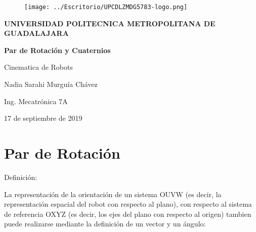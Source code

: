 \documentclass[letterpaper, openright, 12pt, spanish]{report}
\begin{document}
\begin{titlepage}

\begin{center}
\vspace*{-1in}
\begin{figure}[htb]
\begin{center}
\caption{}
\centering
\texttt{[image: ../Escritorio/UPCDLZMDG5783-logo.png]}

\end{center}
\end{figure}

\textbf{UNIVERSIDAD POLITECNICA METROPOLITANA DE GUADALAJARA}\\

\vspace*{0.6in}
\begin{large}
\textbf{Par de Rotaci\'on y Cuaternios}\\
\end{large}

\vspace*{0.1in}
\begin{large}
Cinematica de Robots\\
\end{large}

\vspace*{0.2in}
\begin{large}
Nadia Sarahi Murgu\'ia Ch\'avez\\
\end{large}

\vspace*{0.1in}
\begin{large}
Ing. Mecatr\'onica 7A\\
\end{large}

\vspace*{0.5in}
\begin{large}
17 de septiembre de 2019
\end{large}

\end{center}

\end{titlepage}

\newpage

\section{Par de Rotaci\'on}

Definici\'on:

La representaci\'on de la orientaci\'on de un sistema OUVW (es decir, la representaci\'on espacial del robot con respecto al plano), con respecto al sistema de referencia OXYZ (es decir, los ejes del plano con respecto al origen) tambien puede realizarse mediante la definici\'on de un vector y un \'angulo: 
\end{document}
